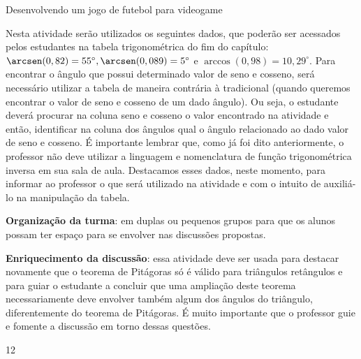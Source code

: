 \begin{sugestions}{Desenvolvendo um jogo de futebol para videogame}
{
Nesta atividade serão utilizados os seguintes dados, que poderão ser acessados pelos estudantes na tabela trigonométrica do fim do capítulo: $\arcsen({0,82}) = 55^\circ, \arcsen({0,089}) = 5^\circ$ e $\arccos({0,98})=10,29^\circ$. Para encontrar o ângulo que possui determinado valor de seno e cosseno, será necessário utilizar a tabela de maneira contrária à tradicional (quando queremos encontrar o valor de seno e cosseno de um dado ângulo). Ou seja, o estudante deverá procurar na coluna seno e cosseno o valor encontrado na atividade e então, identificar na coluna dos ângulos qual o ângulo relacionado ao dado valor de seno e cosseno. É importante lembrar que, como já foi dito anteriormente, o professor não deve utilizar a linguagem e nomenclatura de função trigonométrica inversa em sua sala de aula. Destacamos esses dados, neste momento, para informar ao professor o que será utilizado na atividade e com o intuito de auxiliá-lo na manipulação da tabela.

\textbf{Organização da turma}: em duplas ou pequenos grupos para que os alunos possam ter espaço para se envolver nas discussões propostas.

\textbf{Enriquecimento da discussão}: essa atividade deve ser usada para destacar novamente que o teorema de Pitágoras só é válido para triângulos retângulos e para guiar o estudante a concluir que uma ampliação deste teorema necessariamente deve envolver também algum dos ângulos do triângulo, diferentemente do teorema de Pitágoras. É muito importante que o professor guie e fomente a discussão em torno dessas questões.
}{1}{2}
\end{sugestions}
\clearmargin
\mspace{.25em}
